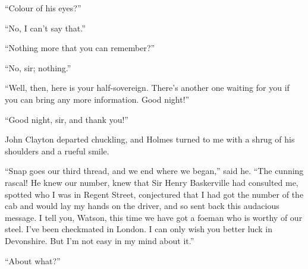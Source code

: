 \documentclass[paper=a5,BCOR=7mm,twoside,DIV=calc,12pt,usegeometry,openany,chapterprefix,endperiod,headings=big]{scrbook} %
\begin{document}
\enquote{Colour of his eyes?}

\enquote{No, I can't say that.}

\enquote{Nothing more that you can remember?}

\enquote{No, sir; nothing.}

\enquote{Well, then, here is your half-sovereign. There's another one waiting for you if you can bring any more information. Good night!}

\enquote{Good night, sir, and thank you!}

John Clayton departed chuckling, and Holmes turned to me with a shrug of his shoulders and a rueful smile.

\enquote{Snap goes our third thread, and we end where we began,} said he. \enquote{The cunning rascal! He knew our number, knew that Sir Henry Baskerville had consulted me, spotted who I was in Regent Street, conjectured that I had got the number of the cab and would lay my hands on the driver, and so sent back this audacious message. I tell you, Watson, this time we have got a foeman who is worthy of our steel. I've been checkmated in London. I can only wish you better luck in Devonshire. But I'm not easy in my mind about it.}

\enquote{About what?}
\end{document}
